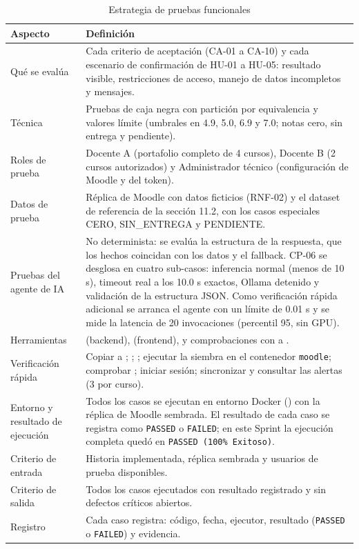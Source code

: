 \documentclass[11pt,a4paper]{article}
\newcommand{\hd}[1]{\textbf{#1}}
\begin{document}
\begin{table}[H]
\centering\small
\caption{Estrategia de pruebas funcionales}
\begin{tabularx}{\textwidth}{|R{3.0cm}|Y|}
\hline
\hd{Aspecto} & \hd{Definición}\\ \hline
Qué se evalúa & Cada criterio de aceptación (CA-01 a CA-10) y cada escenario de confirmación de HU-01 a HU-05: resultado visible, restricciones de acceso, manejo de datos incompletos y mensajes.\\ \hline
Técnica & Pruebas de caja negra con partición por equivalencia y valores límite (umbrales en 4.9, 5.0, 6.9 y 7.0; notas cero, sin entrega y pendiente).\\ \hline
Roles de prueba & Docente A (portafolio completo de 4 cursos), Docente B (2 cursos autorizados) y Administrador técnico (configuración de Moodle y del token).\\ \hline
Datos de prueba & Réplica de Moodle con datos ficticios (RNF-02) y el dataset de referencia de la sección 11.2, con los casos especiales CERO, SIN\_ENTREGA y PENDIENTE.\\ \hline
Pruebas del agente de IA & No determinista: se evalúa la estructura de la respuesta, que los hechos coincidan con los datos y el fallback. CP-06 se desglosa en cuatro sub-casos: inferencia normal (menos de 10 s), timeout real a los 10.0 s exactos, Ollama detenido y validación de la estructura JSON. Como verificación rápida adicional se arranca el agente con un límite de 0.01 s y se mide la latencia de 20 invocaciones (percentil 95, sin GPU).\\ \hline
Herramientas &  (backend),  (frontend),  y comprobaciones con  a .\\ \hline
Verificación rápida & Copiar  a ; ; ; ejecutar la siembra en el contenedor \texttt{moodle}; comprobar ; iniciar sesión; sincronizar y consultar las alertas (3 por curso).\\ \hline
Entorno y resultado de ejecución & Todos los casos se ejecutan en entorno Docker () con la réplica de Moodle sembrada. El resultado de cada caso se registra como \texttt{PASSED} o \texttt{FAILED}; en este Sprint la ejecución completa quedó en \texttt{PASSED (100\% Exitoso)}.\\ \hline
Criterio de entrada & Historia implementada, réplica sembrada y usuarios de prueba disponibles.\\ \hline
Criterio de salida & Todos los casos ejecutados con resultado registrado y sin defectos críticos abiertos.\\ \hline
Registro & Cada caso registra: código, fecha, ejecutor, resultado (\texttt{PASSED} o \texttt{FAILED}) y evidencia.\\ \hline
\end{tabularx}
\end{table}
\end{document}
